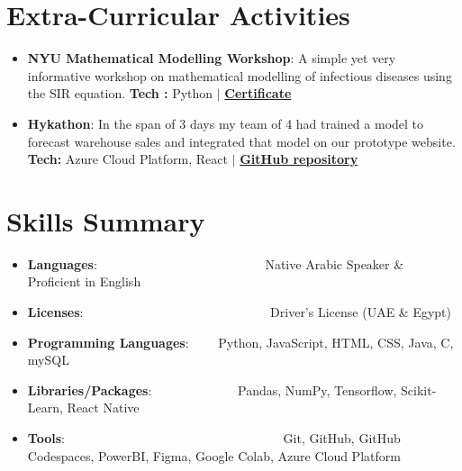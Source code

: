 \documentclass[a4paper,30pt]{article}
\newcommand{\resumeItem}[2] {
	\item\small{
		\textbf{#1}{: #2 \vspace{-2pt}}
	}
}
\newcommand{\resumeSubItem}[2]{\resumeItem{#1}{#2}\vspace{-3pt}}
\newcommand{\resumeSubHeadingListStart}{\begin{itemize}[leftmargin=*]}
\newcommand{\resumeSubHeadingListEnd}{\end{itemize}}
\begin{document}
\section{Extra-Curricular Activities}
	\resumeSubHeadingListStart
        \resumeSubItem{NYU Mathematical Modelling Workshop}{ A simple yet very informative workshop on mathematical modelling of infectious diseases using the SIR equation. \textbf{Tech : } Python $\vert$
        \href{https://github.com/asa30/My-Certificates/blob/main/NYU-Mathematical\%20Modeling\%20Workshop\%20on\%20the\%202nd\%20-\%20Ahmed\%20Sherif\%20Abdelfattah.pdf}{\textbf{Certificate}}
        }
		\resumeSubItem{Hykathon}{ In the span of 3 days my team of 4 had trained a model to forecast warehouse sales and integrated that model on our prototype website.  \textbf{Tech:} Azure Cloud Platform, React $\vert$ \href{https://github.com/AhmedElZubair38/Hykathon}{\textbf{GitHub repository}}}
	\resumeSubHeadingListEnd
	\vspace{-5pt}

\section{Skills Summary}
	\resumeSubHeadingListStart
        \resumeSubItem{Languages}{~~~~~~~~~~~~~~~~~~~~~~~~~~Native Arabic Speaker \& Proficient in English}
		\resumeSubItem{Licenses}{~~~~~~~~~~~~~~~~~~~~~~~~~~~~~Driver's License (UAE \& Egypt) }
		\resumeSubItem{Programming Languages}{~~~~Python, JavaScript, HTML, CSS, Java, C, mySQL}
        \resumeSubItem{Libraries/Packages}{~~~~~~~~~~~~~Pandas, NumPy, Tensorflow, Scikit-Learn, React Native}
		\resumeSubItem{Tools}{~~~~~~~~~~~~~~~~~~~~~~~~~~~~~~~~~~Git, GitHub, GitHub Codespaces, PowerBI, Figma, Google Colab, Azure Cloud Platform}
	\resumeSubHeadingListEnd

\end{document}
